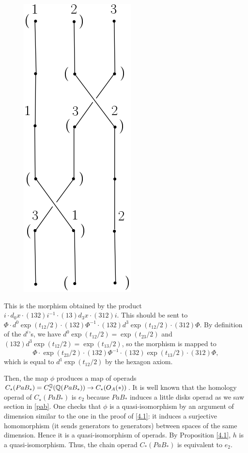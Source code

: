 \documentclass[TFM.tex]{subfiles}
\begin{document}
\begin{figure}[h!]
\includegraphics[scale=0.53]{Imagenes/right}
\end{figure}


This is the morphism obtained by the product $i\cdot d_0x\cdot (132)i^{-1}\cdot (13)d_3x\cdot (312)i$. This should be sent to $\Phi\cdot d^0\exp(t_{12}/2)\cdot (132)\Phi^{-1}\cdot (132)d^3\exp(t_{12}/2)\cdot (312)\Phi$. By definition of the $d^i$'s, we have $d^0\exp(t_{12}/2)=\exp(t_{23}/2)$ and $(132)d^3\exp(t_{12}/2)=\exp(t_{13}/2)$, so the morphism is mapped to $$\Phi\cdot \exp(t_{23}/2)\cdot (132)\Phi^{-1}\cdot (132)\exp(t_{13}/2)\cdot (312)\Phi,$$ which is equal to $d^1\exp(t_{12}/2)$ by the hexagon axiom.

Then, the map $\phi$ produces a map of operads $C_\star(PaB_*)=C_\star^{\mathbb{Q}}(\mathbb{Q}(PaB_*))\to C_\star(O_A(*))$.
It is well known that the homology operad of $C_\star(PaB_*)$ is $e_2$ because $PaB_*$ induces a little disks operad as we saw section in \ref{pab}. One checks that $\phi$ is a quasi-isomorphism by an argument of dimension similar to the one in the proof of \ref{4.1}: it induces a surjective homomorphism (it sends generators to generators) between spaces of the same dimension. Hence it is a quasi-isomorphism of operads. By Proposition \ref{4.1}, $h$ is a quasi-isomorphism. Thus, the
chain operad $C_*(PaB_*)$ is equivalent to $e_2$.



\end{document}
